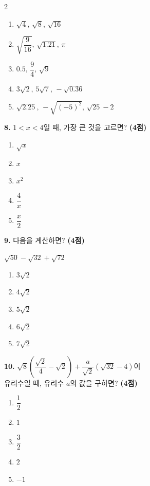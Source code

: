 \documentclass[a4paper,11pt]{article}
\newcommand{\choicenum}[1]{\textcircled{\small #1}}
\newcommand{\scorebox}[1]{\textbf{(#1점)}}
\newcommand{\qbox}[1]{%
  \begin{mdframed}[linewidth=0.8pt,innerleftmargin=6pt,innerrightmargin=6pt,innertopmargin=4pt,innerbottommargin=4pt]
  #1
  \end{mdframed}
}
\begin{document}
\begin{multicols}{2}
\begin{enumerate}[label=\protect\choicenum{\arabic*},leftmargin=*,itemsep=0pt]
  \item $\sqrt{4},\,\sqrt{8},\,\sqrt{16}$
  \item $\sqrt{\dfrac{9}{16}},\,\sqrt{1.21},\,\pi$
  \item $0.5,\,\dfrac{9}{4},\,\sqrt{9}$
  \item $3\sqrt{2},\,5\sqrt{7},\,-\sqrt{0.36}$
  \item $\sqrt{2.25},\,-\sqrt{(-5)^{2}},\,\sqrt{25}-2$
\end{enumerate}

\vspace{3mm}

\noindent\textbf{8.} $1<x<4$일 때, 가장 큰 것을 고르면? \scorebox{4}

\begin{enumerate}[label=\protect\choicenum{\arabic*},leftmargin=*,itemsep=0pt]
  \item $\sqrt{x}$
  \item $x$
  \item $x^{2}$
  \item $\dfrac{4}{x}$
  \item $\dfrac{x}{2}$
\end{enumerate}

\vspace{3mm}

\noindent\textbf{9.} 다음을 계산하면? \scorebox{4}

\qbox{$\sqrt{50}-\sqrt{32}+\sqrt{72}$}

\begin{enumerate}[label=\protect\choicenum{\arabic*},leftmargin=*,itemsep=0pt]
  \item $3\sqrt{2}$
  \item $4\sqrt{2}$
  \item $5\sqrt{2}$
  \item $6\sqrt{2}$
  \item $7\sqrt{2}$
\end{enumerate}

\vspace{3mm}

\noindent\textbf{10.} $\sqrt{8}\!\left(\dfrac{\sqrt{2}}{4}-\sqrt{2}\right)+\dfrac{a}{\sqrt{2}}\!\left(\sqrt{32}-4\right)$이\\
유리수일 때, 유리수 $a$의 값을 구하면? \scorebox{4}

\begin{enumerate}[label=\protect\choicenum{\arabic*},leftmargin=*,itemsep=0pt]
  \item $\dfrac{1}{2}$
  \item $1$
  \item $\dfrac{3}{2}$
  \item $2$
  \item $-1$
\end{enumerate}


\end{multicols}
\end{document}
